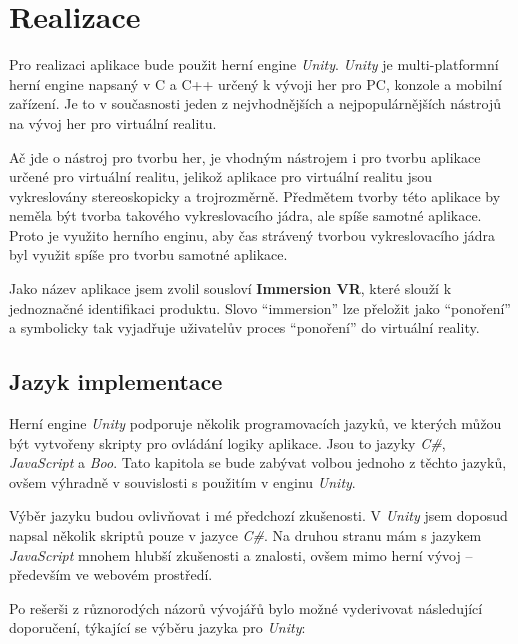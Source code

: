 \section{Realizace}\label{realizace}

Pro realizaci aplikace bude použit herní engine \emph{Unity}.
\emph{Unity} je multi-platformní herní engine napsaný v C a C++ určený k
vývoji her pro PC, konzole a mobilní zařízení. Je to v současnosti jeden
z nejvhodnějších a nejpopulárnějších nástrojů na vývoj her pro virtuální
realitu.

Ač jde o nástroj pro tvorbu her, je vhodným nástrojem i pro tvorbu
aplikace určené pro virtuální realitu, jelikož aplikace pro virtuální
realitu jsou vykreslovány stereoskopicky a trojrozměrně. Předmětem
tvorby této aplikace by neměla být tvorba takového vykreslovacího jádra,
ale spíše samotné aplikace. Proto je využito herního enginu, aby čas
strávený tvorbou vykreslovacího jádra byl využit spíše pro tvorbu
samotné aplikace.

Jako název aplikace jsem zvolil sousloví \textbf{Immersion VR}, které
slouží k jednoznačné identifikaci produktu. Slovo ``immersion'' lze
přeložit jako ``ponoření'' a symbolicky tak vyjadřuje uživatelův proces
``ponoření'' do virtuální reality.

\subsection{Jazyk implementace}\label{jazyk-implementace}

Herní engine \emph{Unity} podporuje několik programovacích jazyků, ve
kterých můžou být vytvořeny skripty pro ovládání logiky aplikace. Jsou
to jazyky \emph{C\#}, \emph{JavaScript} a \emph{Boo}. Tato kapitola se
bude zabývat volbou jednoho z těchto jazyků, ovšem výhradně v
souvislosti s použitím v enginu \emph{Unity}.

Výběr jazyku budou ovlivňovat i mé předchozí zkušenosti. V \emph{Unity}
jsem doposud napsal několik skriptů pouze v jazyce \emph{C\#}. Na druhou
stranu mám s jazykem \emph{JavaScript} mnohem hlubší zkušenosti a
znalosti, ovšem mimo herní vývoj -- především ve webovém prostředí.

Po rešerši z různorodých názorů vývojářů bylo možné vyderivovat
následující doporučení, týkající se výběru jazyka pro \emph{Unity}:

